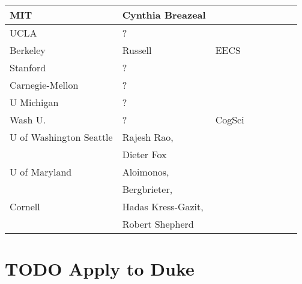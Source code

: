 \documentclass[11pt]{article}
\begin{document}
\begin{center}
\begin{tabular}{llllllll}
\hline
MIT & Cynthia Breazeal &  &  &  &  &  & \\
\hline
UCLA & ? &  &  &  &  &  & \\
\hline
Berkeley & Russell & EECS &  &  &  &  & \\
\hline
Stanford & ? &  &  &  &  &  & \\
\hline
Carnegie-Mellon & ? &  &  &  &  &  & \\
\hline
U Michigan & ? &  &  &  &  &  & \\
\hline
Wash U. & ? & CogSci &  &  &  &  & \\
\hline
U of Washington Seattle & Rajesh Rao, &  &  &  &  &  & \\
 & Dieter Fox &  &  &  &  &  & \\
\hline
U of Maryland & Aloimonos, &  &  &  &  &  & \\
 & Bergbrieter, &  &  &  &  &  & \\
\hline
Cornell & Hadas Kress-Gazit, &  &  &  &  &  & \\
 & Robert Shepherd &  &  &  &  &  & \\
\hline
\end{tabular}
\end{center}



\section{{\bfseries\sffamily TODO} Apply to Duke}
\label{sec:orgheadline1}
\section{}
\label{sec:orgheadline2}
\end{document}
